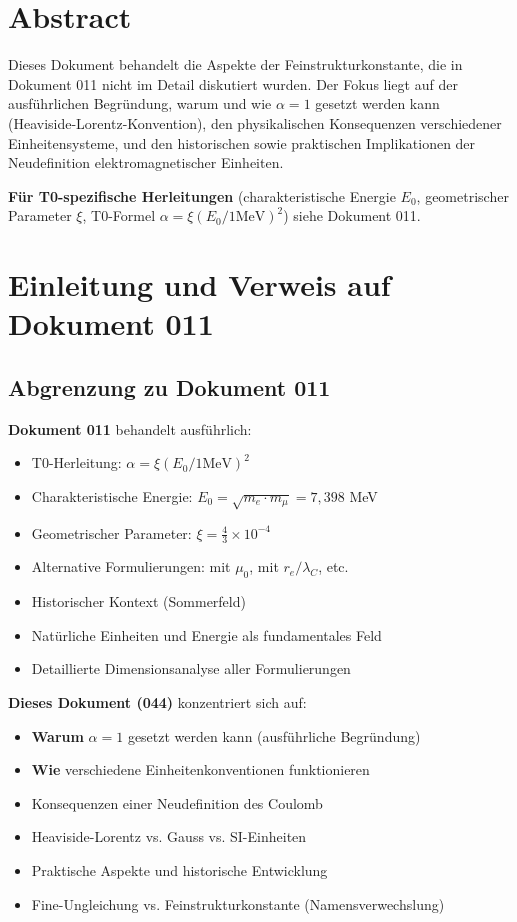 \section*{Abstract}
		Dieses Dokument behandelt die Aspekte der Feinstrukturkonstante, die in Dokument 011 nicht im Detail diskutiert wurden. Der Fokus liegt auf der ausführlichen Begründung, warum und wie $\alpha = 1$ gesetzt werden kann (Heaviside-Lorentz-Konvention), den physikalischen Konsequenzen verschiedener Einheitensysteme, und den historischen sowie praktischen Implikationen der Neudefinition elektromagnetischer Einheiten.
		
		\textbf{Für T0-spezifische Herleitungen} (charakteristische Energie $E_0$, geometrischer Parameter $\xi$, T0-Formel $\alpha = \xi(E_0/1\text{MeV})^2$) siehe Dokument 011.

	
	
	
	\section{Einleitung und Verweis auf Dokument 011}
	
	\subsection{Abgrenzung zu Dokument 011}
	
	\textbf{Dokument 011} behandelt ausführlich:
	\begin{itemize}
		\item T0-Herleitung: $\alpha = \xi(E_0/1\text{MeV})^2$
		\item Charakteristische Energie: $E_0 = \sqrt{m_e \cdot m_\mu} = 7{,}398$ MeV
		\item Geometrischer Parameter: $\xi = \frac{4}{3} \times 10^{-4}$
		\item Alternative Formulierungen: mit $\mu_0$, mit $r_e/\lambda_C$, etc.
		\item Historischer Kontext (Sommerfeld)
		\item Natürliche Einheiten und Energie als fundamentales Feld
		\item Detaillierte Dimensionsanalyse aller Formulierungen
	\end{itemize}
	
	\textbf{Dieses Dokument (044)} konzentriert sich auf:
	\begin{itemize}
		\item \textbf{Warum} $\alpha = 1$ gesetzt werden kann (ausführliche Begründung)
		\item \textbf{Wie} verschiedene Einheitenkonventionen funktionieren
		\item Konsequenzen einer Neudefinition des Coulomb
		\item Heaviside-Lorentz vs. Gauss vs. SI-Einheiten
		\item Praktische Aspekte und historische Entwicklung
		\item Fine-Ungleichung vs. Feinstrukturkonstante (Namensverwechslung)
	\end{itemize}
	
